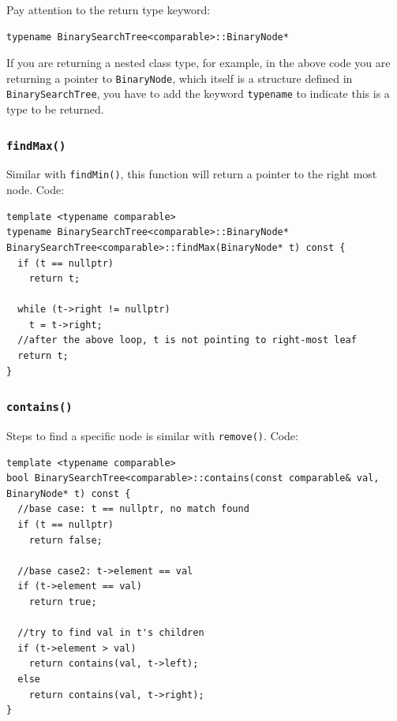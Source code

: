 \documentclass[11pt]{book}
\begin{document}
Pay attention to the return type keyword:
\begin{verbatim}
typename BinarySearchTree<comparable>::BinaryNode*
\end{verbatim}
If you are returning a nested class type, for example, in the above code you are returning a pointer to \texttt{BinaryNode}, which itself is a structure defined in \texttt{BinarySearchTree}, you have to add the keyword \texttt{typename} to indicate this is a type to be returned.

\subsubsection{\texttt{findMax()}}
\label{sec:org6c33701}
Similar with \texttt{findMin()}, this function will return a pointer to the right most node. Code:
\begin{verbatim}
template <typename comparable>
typename BinarySearchTree<comparable>::BinaryNode* BinarySearchTree<comparable>::findMax(BinaryNode* t) const {
  if (t == nullptr)
    return t;

  while (t->right != nullptr)
    t = t->right;
  //after the above loop, t is not pointing to right-most leaf
  return t;   
}
\end{verbatim}

\subsubsection{\texttt{contains()}}
\label{sec:orga9f6b6f}
Steps to find a specific node is similar with \texttt{remove()}. Code:
\begin{verbatim}
template <typename comparable>
bool BinarySearchTree<comparable>::contains(const comparable& val, BinaryNode* t) const {
  //base case: t == nullptr, no match found
  if (t == nullptr)
    return false;

  //base case2: t->element == val
  if (t->element == val)
    return true;

  //try to find val in t's children
  if (t->element > val)
    return contains(val, t->left);
  else 
    return contains(val, t->right);
}
\end{verbatim}
\end{document}
